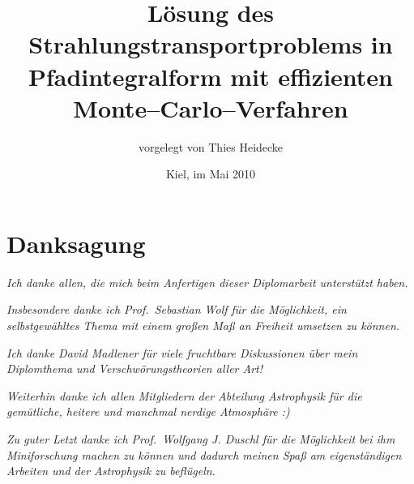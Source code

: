 \documentclass[
	12pt,
	a4paper,
	pagesize=auto,
	DIV=10,
	parskip=half,
	titlepage,
	twoside,
	listof=totoc,
	bibliography=totocnumbered,
	final%
]{scrbook}
\begin{document}
\frontmatter
	\titlehead{Christian--Albrechts--Universität zu Kiel\\Institut für Theoretische Physik und Astrophysik}
	\subject{Diplomarbeit}
	\title{Lösung des Strahlungstransportproblems in Pfadintegralform mit effizienten Monte--Carlo--Verfahren}
	\author{vorgelegt von Thies Heidecke}%
	\date{Kiel, im Mai 2010}
	\publishers{betreut durch Prof. Dr. Sebastian Wolf}
	\maketitle

	\tableofcontents	%
	
\mainmatter
	
	
	
	
	
	
	
	
	
\backmatter
	\chapter{Danksagung}
	{\centering\Large
	\textsl{Ich danke allen, die mich beim Anfertigen dieser Diplomarbeit unterstützt haben.}
	
	\vspace{1em}
	\textsl{Insbesondere danke ich Prof.~Sebastian Wolf für die Möglichkeit, ein selbstgewähltes Thema mit einem großen Maß an Freiheit umsetzen zu können.}

	\vspace{1em}
	\textsl{Ich danke David Madlener für viele fruchtbare Diskussionen über mein Diplomthema und Verschwörungstheorien aller Art!}

	\vspace{1em}
	\textsl{Weiterhin danke ich allen Mitgliedern der Abteilung Astrophysik für die gemütliche, heitere und manchmal nerdige Atmosphäre :)}

	\vspace{1em}
	\textsl{Zu guter Letzt danke ich Prof.~Wolfgang J. Duschl für die Möglichkeit bei ihm Miniforschung machen zu können und dadurch meinen Spaß am eigenständigen Arbeiten und der Astrophysik zu beflügeln.}\vfill\par}
	
	\mdqoff
	
	
	\mdqon
	
\end{document}
